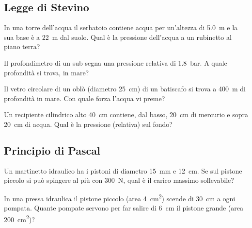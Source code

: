 \subsection*{Legge di Stevino}

\begin{esercizio}
In una torre dell'acqua il serbatoio contiene acqua per un'altezza di \SI{5,0}{\metre} e la sua base è a \SI{22}{\metre} dal suolo. Qual è la pressione dell'acqua a un rubinetto al piano terra?\\
\end{esercizio}

\begin{esercizio}
Il profondimetro di un sub segna una pressione relativa di \SI{1,8}{\bar}. A quale profondità si trova, in mare?\\
\end{esercizio}

\begin{esercizio}
Il vetro circolare di un oblò (diametro \SI{25}{\centi\metre}) di un batiscafo si trova a \SI{400}{\metre} di profondità in mare. Con quale forza l'acqua vi preme?\\
\end{esercizio}

\begin{esercizio}
Un recipiente cilindrico alto \SI{40}{\centi\metre} contiene, dal basso, \SI{20}{\centi\metre} di mercurio e sopra \SI{20}{\centi\metre} di acqua. Qual è la pressione (relativa) sul fondo?\\
\end{esercizio}

\subsection*{Principio di Pascal}

\begin{esercizio}
Un martinetto idraulico ha i pistoni di diametro \SI{15}{\milli\metre} e \SI{12}{\centi\metre}. Se sul pistone piccolo si può spingere al più con \SI{300}{\newton}, qual è il carico massimo sollevabile?\\
\end{esercizio}

\begin{esercizio}
In una pressa idraulica il pistone piccolo (area \SI{4}{\centi\metre\squared}) scende di \SI{30}{\centi\metre} a ogni pompata. Quante pompate servono per far salire di \SI{6}{\centi\metre} il pistone grande (area \SI{200}{\centi\metre\squared})?\\
\end{esercizio}


